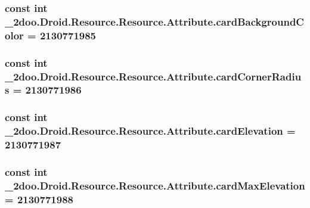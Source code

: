 \hypertarget{class__2doo_1_1_droid_1_1_resource_1_1_attribute_22434689a4c2868d7b0f1cec9d20e86f}{
\subsubsection[{cardBackgroundColor}]{\setlength{\rightskip}{0pt plus 5cm}const int \_\-2doo.Droid.Resource.Resource.Attribute.cardBackgroundColor = 2130771985}}
\label{class__2doo_1_1_droid_1_1_resource_1_1_attribute_22434689a4c2868d7b0f1cec9d20e86f}


\hypertarget{class__2doo_1_1_droid_1_1_resource_1_1_attribute_cfc8dcd3d82e2841e29687308a6e501f}{
\subsubsection[{cardCornerRadius}]{\setlength{\rightskip}{0pt plus 5cm}const int \_\-2doo.Droid.Resource.Resource.Attribute.cardCornerRadius = 2130771986}}
\label{class__2doo_1_1_droid_1_1_resource_1_1_attribute_cfc8dcd3d82e2841e29687308a6e501f}


\hypertarget{class__2doo_1_1_droid_1_1_resource_1_1_attribute_954025fc7e63b9e2148f3e5ab7205f97}{
\subsubsection[{cardElevation}]{\setlength{\rightskip}{0pt plus 5cm}const int \_\-2doo.Droid.Resource.Resource.Attribute.cardElevation = 2130771987}}
\label{class__2doo_1_1_droid_1_1_resource_1_1_attribute_954025fc7e63b9e2148f3e5ab7205f97}


\hypertarget{class__2doo_1_1_droid_1_1_resource_1_1_attribute_0650d28fda981115871d6b736c34d23e}{
\subsubsection[{cardMaxElevation}]{\setlength{\rightskip}{0pt plus 5cm}const int \_\-2doo.Droid.Resource.Resource.Attribute.cardMaxElevation = 2130771988}}
\label{class__2doo_1_1_droid_1_1_resource_1_1_attribute_0650d28fda981115871d6b736c34d23e}



